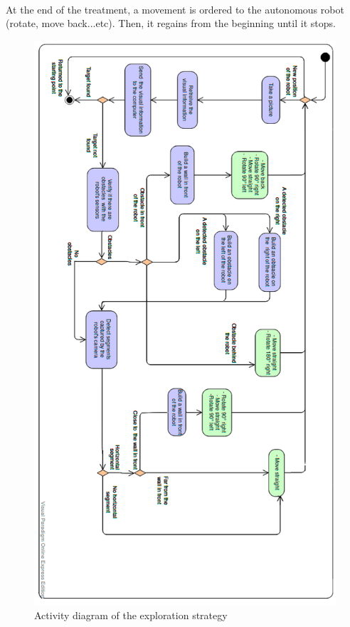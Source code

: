 \documentclass[12pt]{report}
\begin{document}
\paragraph{}
At the end of the treatment, a movement is ordered to the autonomous robot (rotate, move back...etc). Then, it regains from the beginning until it stops.
\newpage
	\begin{figure}[H]
	\begin{center}
		\includegraphics[scale=0.55]{res/order_processing.png}
		\caption{Activity diagram of the exploration strategy}
	\end{center}
\end{figure}
\newpage
	
\end{document}
